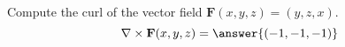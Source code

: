 \begin{problem}
Compute the curl of the vector field $\mathbf{F}(x,y,z) = (y,z,x)$.
\[
\nabla\times\mathbf{F}(x,y,z) = \answer{(-1,-1,-1)}
\]
\end{problem}